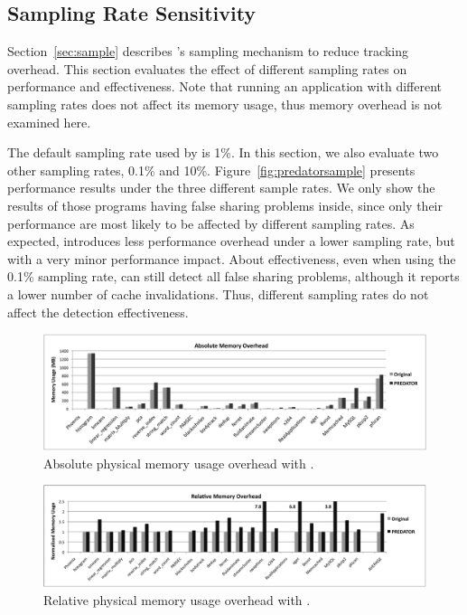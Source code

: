\subsection{Sampling Rate Sensitivity}
\label{sec:predatorsensitivity}
Section~\ref{sec:sample} describes \Predator{}'s sampling mechanism to reduce tracking overhead. This section evaluates the effect of different sampling rates on performance and effectiveness. Note that running an application with different sampling rates does not affect its memory usage, thus memory overhead is not examined here. 

The default sampling rate used by \Predator{} is 1\%. In this section, we also evaluate two other sampling rates, 0.1\% and 10\%. Figure~\ref{fig:predatorsample} presents performance results under the three different sample rates. We only show the results of those programs having false sharing problems inside, since only their performance are most likely to be affected by different sampling rates. As expected, \Predator{} introduces less performance overhead under a lower sampling rate, but with a very minor performance impact. About effectiveness, even when using the 0.1\% sampling rate, \Predator{} can still detect all false sharing problems, although it reports a lower number of cache invalidations. Thus, different sampling rates do not affect the detection effectiveness.
 
\begin{figure}[!t]
\centering
\includegraphics[width=6in]{predator/figure/absolutememory}
\caption{Absolute physical memory usage overhead with \Predator{}.}
\label{fig:absolutememusage}
\end{figure}

\begin{figure}[!t]
\centering
\includegraphics[width=6in]{predator/figure/memusage}
\caption{Relative physical memory usage overhead with \Predator{}.}
\label{fig:memusage}
\end{figure}

